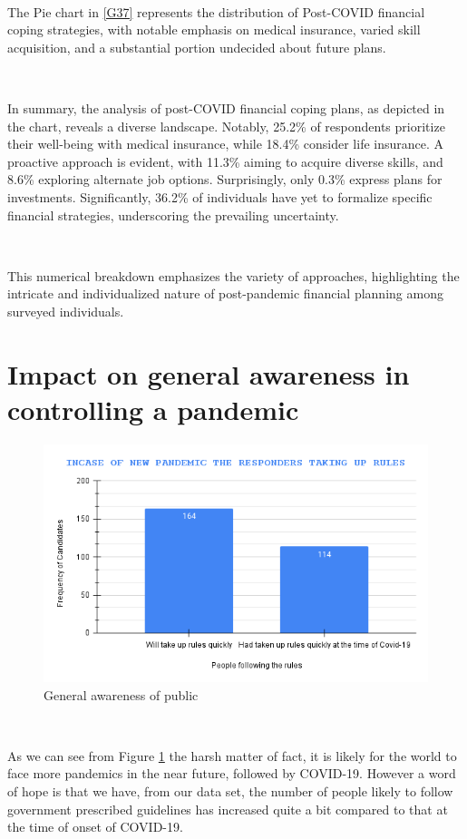 \ 

The Pie chart in \ref{G37} represents the distribution of Post-COVID financial coping strategies, with notable emphasis on medical insurance, varied skill acquisition, and a substantial portion undecided about future plans.

\

In summary, the analysis of post-COVID financial coping plans, as depicted in the chart, reveals a diverse landscape. Notably, 25.2\% of respondents prioritize their well-being with medical insurance, while 18.4\% consider life insurance. A proactive approach is evident, with 11.3\% aiming to acquire diverse skills, and 8.6\% exploring alternate job options. Surprisingly, only 0.3\% express plans for investments. Significantly, 36.2\% of individuals have yet to formalize specific financial strategies, underscoring the prevailing uncertainty. 

\

This numerical breakdown emphasizes the variety of approaches, highlighting the intricate and individualized nature of post-pandemic financial planning among surveyed individuals.

\section{Impact on general awareness in controlling a pandemic}

\begin{figure}[h!]
	\centering
	\includegraphics[width=0.9\linewidth]{IMAGES/Image 38.png}
	\caption{General awareness of public}
	\label{G38}
\end{figure}

\ 

As we can see from Figure \ref{G38} the harsh matter of fact, it is likely for the world to face more pandemics in the near future, followed by COVID-19. However a word of hope is that we have, from our data set, the number of people likely to follow government prescribed guidelines has increased quite a bit compared to that at the time of onset of COVID-19.

